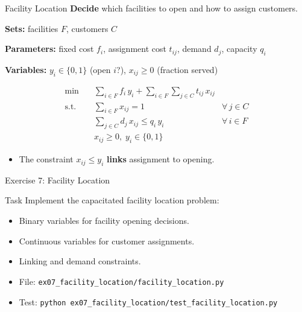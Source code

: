 \documentclass[aspectratio=169,10pt]{beamer}
\begin{document}
\begin{frame}{Facility Location}
\textbf{Decide} which facilities to open and how to assign customers.

\medskip
\textbf{Sets:} facilities $F$, customers $C$

\textbf{Parameters:} fixed cost $f_i$, assignment cost $t_{ij}$, demand $d_j$, capacity $q_i$

\textbf{Variables:} $y_i \in \{0,1\}$ (open $i$?), \; $x_{ij} \ge 0$ (fraction served)

\begin{align*}
  \min \quad & \sum_{i \in F} f_i\, y_i
    + \sum_{i \in F}\sum_{j \in C} t_{ij}\, x_{ij} \\
  \text{s.t.} \quad
    & \sum_{i \in F} x_{ij} = 1
      & \forall\, j \in C \\
    & \sum_{j \in C} d_j\, x_{ij} \le q_i\, y_i
      & \forall\, i \in F \\
    & x_{ij} \ge 0,\; y_i \in \{0,1\}
\end{align*}

\begin{itemize}
  \item The constraint $x_{ij} \le y_i$ \textbf{links} assignment to opening.
\end{itemize}
\end{frame}

\begin{frame}{Exercise 7: Facility Location}
\begin{block}{Task}
Implement the capacitated facility location problem:
\begin{itemize}
  \item Binary variables for facility opening decisions.
  \item Continuous variables for customer assignments.
  \item Linking and demand constraints.
\end{itemize}
\end{block}
\begin{itemize}
  \item File: \texttt{ex07\_facility\_location/facility\_location.py}
  \item Test: \texttt{python ex07\_facility\_location/test\_facility\_location.py}
\end{itemize}
\end{frame}
\end{document}
